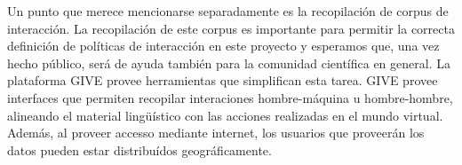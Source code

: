 \begin{myitemize}
Un punto que merece mencionarse separadamente es la recopilaci\'on
de corpus de interacci\'on.  La recopilaci\'on de este corpus es
importante para permitir la correcta definici\'on de pol\'iticas de
interacci\'on en este proyecto y esperamos que, una vez hecho p\'ublico, 
ser\'a de ayuda tambi\'en para la comunidad cient\'ifica en general. La
plataforma GIVE provee herramientas que simplifican esta tarea.  GIVE
provee interfaces que permiten recopilar interaciones hombre-m\'aquina u
hombre-hombre, alineando el material ling\"u\'istico con las acciones
realizadas en el mundo virtual.  Adem\'as, al proveer
accesso mediante internet, los usuarios que proveer\'an los datos pueden
estar distribu\'idos geogr\'aficamente.
\end{myitemize}
